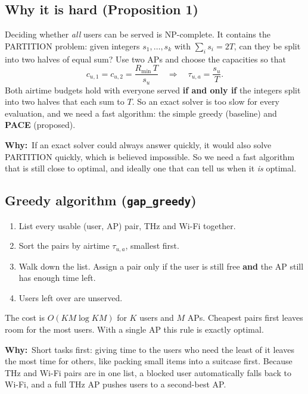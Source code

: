 \documentclass[11pt,a4paper]{article}
\newcommand{\Rmin}{R_{\min}}
\newcommand{\why}[1]{\par\smallskip\noindent\begin{minipage}{\linewidth}\small
  \textcolor{whyc}{\textbf{Why:}}~#1\end{minipage}\par\medskip}
\begin{document}
\subsection{Why it is hard (Proposition 1)}
Deciding whether \emph{all} users can be served is NP-complete. It contains the PARTITION
problem: given integers $s_1,\dots,s_k$ with $\sum_i s_i=2T$, can they be split into two halves
of equal sum? Use two APs and choose the capacities so that
\[
c_{u,1}=c_{u,2}=\frac{\Rmin\,T}{s_u}
\quad\Longrightarrow\quad
\tau_{u,a}=\frac{s_u}{T}.
\]
Both airtime budgets hold with everyone served \textbf{if and only if} the integers split into
two halves that each sum to $T$. So an exact solver is too slow for every evaluation, and we
need a fast algorithm: the simple greedy (baseline) and \textbf{PACE} (proposed).
\why{If an exact solver could always answer quickly, it would also solve PARTITION quickly, which is believed impossible. So we need a fast algorithm that is still close to optimal, and ideally one that can tell us when it \emph{is} optimal.}

\subsection{Greedy algorithm (\texttt{gap\_greedy})}
\begin{enumerate}
\item List every usable (user, AP) pair, THz and Wi-Fi together.
\item Sort the pairs by airtime $\tau_{u,a}$, smallest first.
\item Walk down the list. Assign a pair only if the user is still free \textbf{and} the AP
  still has enough time left.
\item Users left over are unserved.
\end{enumerate}
The cost is $O(KM\log KM)$ for $K$ users and $M$ APs. Cheapest pairs first leaves room for
the most users. With a single AP this rule is exactly optimal.
\why{Short tasks first: giving time to the users who need the least of it leaves the most time for others, like packing small items into a suitcase first. Because THz and Wi-Fi pairs are in one list, a blocked user automatically falls back to Wi-Fi, and a full THz AP pushes users to a second-best AP.}
\end{document}
